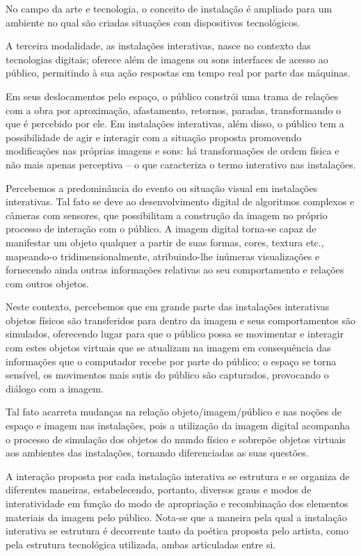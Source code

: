 No campo da arte e tecnologia, o conceito de instalação é ampliado para um ambiente no qual são criadas situações com dispositivos tecnológicos. \cite[p. 5]{bochio}

A terceira modalidade, as instalações interativas, nasce no contexto das tecnologias digitais; oferece além de imagens ou sons interfaces de acesso ao público, permitindo à sua ação respostas em tempo real por parte das máquinas. \cite[p. 6]{bochio}

Em seus deslocamentos pelo espaço, o público constrói uma trama de relações com a obra por aproximação, afastamento, retornos, paradas, transformando o que é percebido por ele. Em instalações interativas, além disso, o público tem a possibilidade de agir e interagir com a situação proposta promovendo modificações nas próprias imagens e sons:  há transformações de ordem física e não mais apenas perceptiva – o que caracteriza o termo interativo nas instalações.  \cite[p. 6]{bochio}

Percebemos a predominância do evento ou situação visual em instalações interativas. Tal fato se deve ao desenvolvimento digital de algoritmos complexos e câmeras com sensores, que possibilitam a construção da imagem no próprio processo de interação com o público. A imagem digital torna-se capaz de manifestar um objeto qualquer a partir de suas formas, cores, textura etc., mapeando-o tridimensionalmente, atribuindo-lhe inúmeras visualizações e fornecendo ainda outras informações relativas ao seu comportamento e relações com outros objetos. \cite[p. 6]{bochio}

Neste contexto, percebemos que em grande parte das instalações interativas objetos físicos são transferidos para dentro da imagem e seus comportamentos são simulados, oferecendo lugar para que o público possa se movimentar e interagir com estes objetos virtuais que se atualizam na imagem em consequência das informações que o computador recebe por parte do público; o espaço se torna sensível, os movimentos mais sutis do público são capturados, provocando o diálogo com a imagem. \cite[p. 6]{bochio}

Tal fato acarreta mudanças na relação objeto/imagem/público e nas noções de espaço e imagem nas instalações, pois a utilização da imagem digital acompanha o processo de simulação dos objetos do mundo físico e sobrepõe objetos virtuais aos ambientes das instalações, tornando diferenciadas as suas questões. \cite[p. 6]{bochio}

A interação proposta por cada instalação interativa se estrutura e se organiza de diferentes maneiras, estabelecendo, portanto, diversos graus e modos de interatividade em função do modo de apropriação e recombinação dos elementos materiais da imagem
pelo público. Nota-se que a maneira pela qual a instalação interativa se estrutura é decorrente tanto da poética proposta pelo artista, como pela estrutura tecnológica utilizada, ambas articuladas entre si. \cite[p. 6-7]{bochio}


